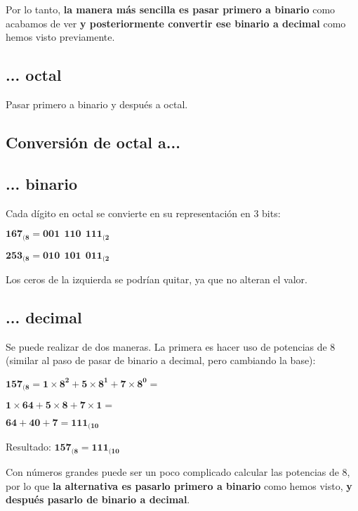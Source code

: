 Por lo tanto, \textbf{la manera más sencilla es pasar primero a binario} como acabamos de ver \textbf{y posteriormente convertir ese binario a decimal} como hemos visto previamente.

\subsection*{... octal}
Pasar primero a binario y después a octal.



\subsection{Conversión de octal a...}
\subsection*{... binario}
Cada dígito en octal se convierte en su representación en 3 bits:

\begin{center}
    \vspace{-15pt}
    $\mathbf{167_{(8} = 001\ \ 110\ \ 111_{(2}}$

    $\mathbf{253_{(8} = 010\ \ 101\ \ 011_{(2}}$
    \vspace{-15pt}
\end{center}
Los ceros de la izquierda se podrían quitar, ya que no alteran el valor.

\subsection*{... decimal}
Se puede realizar de dos maneras. La primera es hacer uso de potencias de 8 (similar al paso de pasar de binario a decimal, pero cambiando la base):

\begin{center}
    \vspace{-15pt}
    $\mathbf{157_{(8} = 1\times8^2 + 5\times8^1 + 7\times8^0 = }$

    $\mathbf{1\times64 + 5\times8 + 7\times1 = }$

    $\mathbf{64 + 40 + 7 = 111_{(10}}$

    Resultado: $\mathbf{157_{(8} = 111_{(10}}$
    \vspace{-15pt}
\end{center}

Con números grandes puede ser un poco complicado calcular las potencias de 8, por lo que \textbf{la alternativa es pasarlo primero a binario} como hemos visto, \textbf{y después pasarlo de binario a decimal}.

